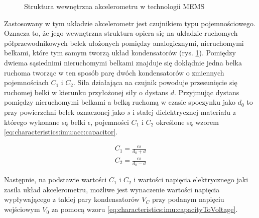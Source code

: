 \begin{figure}[!htp]
							
	\caption{Struktura wewnętrzna akcelerometru w technologii MEMS}
	\label{fig:characteristics:imu:acc:mems}
\end{figure}
		
Zastosowany w tym układzie akcelerometr jest czujnikiem typu pojemnościowego. Oznacza to, że jego wewnętrzna struktura opiera się na układzie ruchomych półprzewodnikowych belek ułożonych pomiędzy analogicznymi, nieruchomymi belkami, które tym samym tworzą układ kondensatorów (rys. \ref{fig:characteristics:imu:acc:mems}). Pomiędzy dwiema sąsiednimi nieruchomymi belkami znajduje się dokłądnie jedna belka ruchoma tworząc w ten sposób parę dwóch kondensatorów o zmiennych pojemnościach $C_1$ i $C_2$. Siła działająca na czujnik powoduje przesunięcie się ruchomej belki w kierunku przyłożonej siły o dystans $d$. Przyjmując dystans pomiędzy nieruchomymi belkami a belką ruchomą w czasie spoczynku jako $d_0$ to przy powierzchni belek oznaczonej jako $s$ i stałej dielektrycznej materiału z którego wykonane są belki $\epsilon$, pojemności $C_1$ i $C_2$ określone są wzorem \eqref{eq:characteristics:imu:acc:capacitor}.
	
\begin{subequations}
	\begin{align}
		C_1 = \frac{\epsilon s}{d_0 + d}             \\ 
		C_2 = \frac{\epsilon s}{d_0 - d}             
		\label{eq:characteristics:imu:acc:capacitor} 
	\end{align}
\end{subequations}
	
Następnie, na podstawie wartości $C_1$ i $C_2$ i wartości napięcia elektrycznego jaki zasila układ akcelerometru, możliwe jest wynaczenie wartości napięcia wypływającego z takiej pary kondensatorów $V_C$ przy podanym napięciu wejściowym $V_0$ za pomocą wzoru \eqref{eq:characteristics:imu:capacityToVoltage}.

